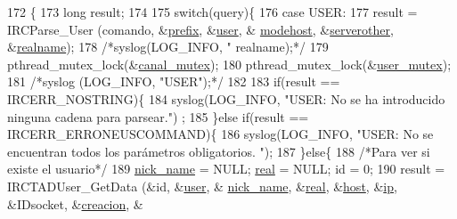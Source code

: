 \begin{DoxyCode}
172                                                               \{
173         \textcolor{keywordtype}{long} result;
174 
175         \textcolor{keywordflow}{switch}(query)\{
176                 \textcolor{keywordflow}{case} USER:
177                         result = IRCParse\_User (comando, &\hyperlink{_g-2361-06-_p1-_server_8c_ad2849cf781a4db22cc1b31eaaee50a4f}{prefix}, &\hyperlink{_g-2361-06-_p1-_server_8c_a14871705f45ccdc5bb9f4549efd8e119}{user}, &
      \hyperlink{_g-2361-06-_p1-_server_8c_a4f28f55d19ac069eabc38c224c3a4225}{modehost}, &\hyperlink{_g-2361-06-_p1-_server_8c_ae6eaaf28b08889a7ec2359f8968d796c}{serverother}, &\hyperlink{_g-2361-06-_p1-_server_8c_a980ab011cd3d327b370c042833f1dc08}{realname});
178                         \textcolor{comment}{/*syslog(LOG\_INFO, "%
       realname);*/}
179                         pthread\_mutex\_lock(&\hyperlink{_g-2361-06-_p1-_server_8c_ab86a544a49de18195048bac54dd3ac3e}{canal\_mutex});
180                         pthread\_mutex\_lock(&\hyperlink{_g-2361-06-_p1-_server_8c_a5dedd07a1144d2ab70b74a8e64b6a7c0}{user\_mutex});
181                         \textcolor{comment}{/*syslog (LOG\_INFO, "USER");*/}
182 
183                         \textcolor{keywordflow}{if}(result == IRCERR\_NOSTRING)\{
184                                 syslog(LOG\_INFO, \textcolor{stringliteral}{"USER: No se ha introducido ninguna cadena para parsear."})
      ;
185                         \}\textcolor{keywordflow}{else} \textcolor{keywordflow}{if}(result == IRCERR\_ERRONEUSCOMMAND)\{
186                                 syslog(LOG\_INFO, \textcolor{stringliteral}{"USER: No se encuentran todos los parámetros obligatorios.
      "});
187                         \}\textcolor{keywordflow}{else}\{
188                                 \textcolor{comment}{/*Para ver si existe el usuario*/}
189                                 \hyperlink{_g-2361-06-_p1-_server_8c_aabbf66718cda228b924a4a9441eadf62}{nick\_name} = NULL; \hyperlink{_g-2361-06-_p1-_server_8c_af832f551e1c343666c3d2a55834139a0}{real} = NULL; \textcolor{keywordtype}{id} = 0;
190                                 result = IRCTADUser\_GetData (&\textcolor{keywordtype}{id}, &\hyperlink{_g-2361-06-_p1-_server_8c_a14871705f45ccdc5bb9f4549efd8e119}{user}, &
      \hyperlink{_g-2361-06-_p1-_server_8c_aabbf66718cda228b924a4a9441eadf62}{nick\_name}, &\hyperlink{_g-2361-06-_p1-_server_8c_af832f551e1c343666c3d2a55834139a0}{real}, &\hyperlink{_g-2361-06-_p1-_server_8c_a1c2046dcb30a629d6d9f45ff8f403f12}{host}, &\hyperlink{_g-2361-06-_p1-_server_8c_afbc356cd0e25d1dbbece7c10fd025fa6}{ip}, &IDsocket, &\hyperlink{_g-2361-06-_p1-_server_8c_a26292066ca0d17922eadee4161542ab9}{creacion}, &

\end{DoxyCode}
